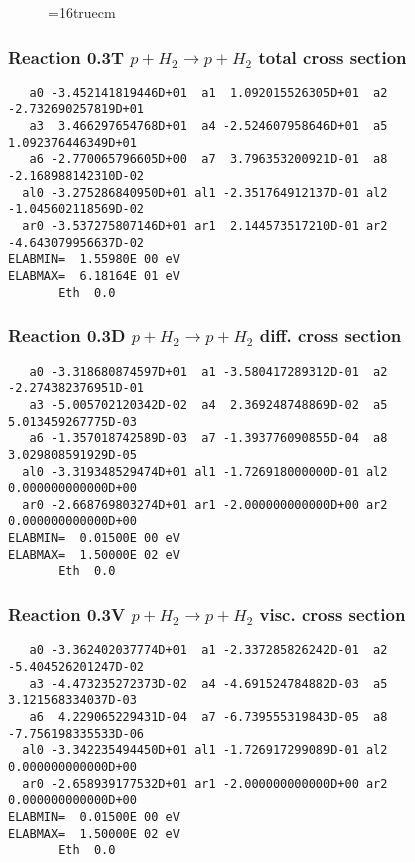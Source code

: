 \documentclass[12pt,dvipdfmx]{article}
\begin{document}
\begin{figure} \label{0.2}
\epsfxsize=16truecm
\end{figure}
\newpage

\subsubsection{
Reaction 0.3T    $p + H_2 \rightarrow p + H_2 $  total cross section
}
\begin{small}\begin{verbatim}
   a0 -3.452141819446D+01  a1  1.092015526305D+01  a2 -2.732690257819D+01
   a3  3.466297654768D+01  a4 -2.524607958646D+01  a5  1.092376446349D+01
   a6 -2.770065796605D+00  a7  3.796353200921D-01  a8 -2.168988142310D-02
  al0 -3.275286840950D+01 al1 -2.351764912137D-01 al2 -1.045602118569D-02
  ar0 -3.537275807146D+01 ar1  2.144573517210D-01 ar2 -4.643079956637D-02
ELABMIN=  1.55980E 00 eV
ELABMAX=  6.18164E 01 eV
       Eth  0.0
\end{verbatim}\end{small}

\subsubsection{
Reaction 0.3D   $ p + H_2 \rightarrow p + H_2 $  diff. cross section
}
\begin{small}\begin{verbatim}
   a0 -3.318680874597D+01  a1 -3.580417289312D-01  a2 -2.274382376951D-01
   a3 -5.005702120342D-02  a4  2.369248748869D-02  a5  5.013459267775D-03
   a6 -1.357018742589D-03  a7 -1.393776090855D-04  a8  3.029808591929D-05
  al0 -3.319348529474D+01 al1 -1.726918000000D-01 al2  0.000000000000D+00
  ar0 -2.668769803274D+01 ar1 -2.000000000000D+00 ar2  0.000000000000D+00
ELABMIN=  0.01500E 00 eV
ELABMAX=  1.50000E 02 eV
       Eth  0.0
\end{verbatim}\end{small}

\subsubsection{
Reaction 0.3V   $  p + H_2 \rightarrow p + H_2  $ visc. cross section
}
\begin{small}\begin{verbatim}
   a0 -3.362402037774D+01  a1 -2.337285826242D-01  a2 -5.404526201247D-02
   a3 -4.473235272373D-02  a4 -4.691524784882D-03  a5  3.121568334037D-03
   a6  4.229065229431D-04  a7 -6.739555319843D-05  a8 -7.756198335533D-06
  al0 -3.342235494450D+01 al1 -1.726917299089D-01 al2  0.000000000000D+00
  ar0 -2.658939177532D+01 ar1 -2.000000000000D+00 ar2  0.000000000000D+00
ELABMIN=  0.01500E 00 eV
ELABMAX=  1.50000E 02 eV
       Eth  0.0
\end{verbatim}\end{small}
\end{document}
